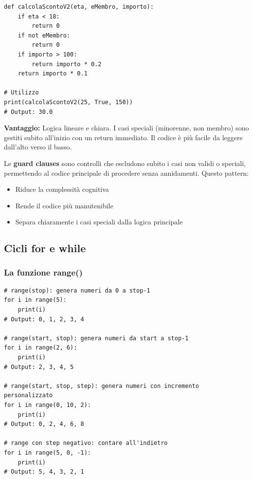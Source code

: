 \begin{tcolorbox}[
    title=\textbf{Con early return (guard clauses)},
    colback=green!10,
    colframe=green!70!black,
    fonttitle=\bfseries,
    boxrule=1.5pt,
    arc=2mm
]
\begin{lstlisting}
def calcolaScontoV2(eta, eMembro, importo):
    if eta < 18:
        return 0
    if not eMembro:
        return 0
    if importo > 100:
        return importo * 0.2
    return importo * 0.1

# Utilizzo
print(calcolaScontoV2(25, True, 150))
# Output: 30.0
\end{lstlisting}
\textbf{Vantaggio:} Logica lineare e chiara. I casi speciali (minorenne, non membro) sono gestiti subito all'inizio con un return immediato. Il codice è più facile da leggere dall'alto verso il basso.
\end{tcolorbox}

\begin{tcolorbox}[title=Guard Clauses]
Le \textbf{guard clauses} sono controlli che escludono subito i casi non validi o speciali, permettendo al codice principale di procedere senza annidamenti. Questo pattern:
\begin{itemize}
  \item Riduce la complessità cognitiva
  \item Rende il codice più manutenibile
  \item Separa chiaramente i casi speciali dalla logica principale
\end{itemize}
\end{tcolorbox}

\vspace{0.3cm}

\subsection{Cicli for e while}
\label{subsec:cf-cicli}

\subsubsection{La funzione range()}
\label{subsubsec:cf-range}
\begin{lstlisting}
# range(stop): genera numeri da 0 a stop-1
for i in range(5):
    print(i)
# Output: 0, 1, 2, 3, 4

# range(start, stop): genera numeri da start a stop-1
for i in range(2, 6):
    print(i)
# Output: 2, 3, 4, 5

# range(start, stop, step): genera numeri con incremento personalizzato
for i in range(0, 10, 2):
    print(i)
# Output: 0, 2, 4, 6, 8

# range con step negativo: contare all'indietro
for i in range(5, 0, -1):
    print(i)
# Output: 5, 4, 3, 2, 1
\end{lstlisting}

